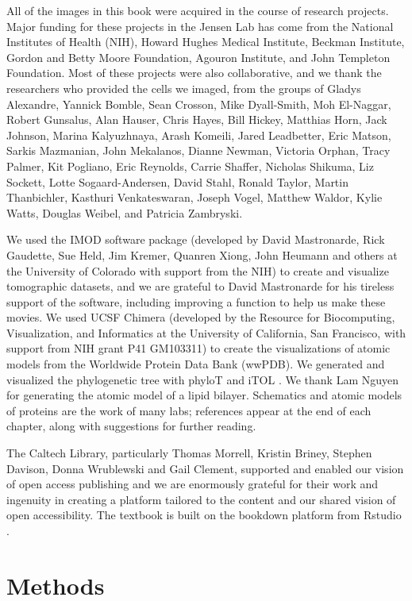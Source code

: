 \documentclass[]{tufte-book}
\begin{document}
All of the images in this book were acquired in the course of research
projects. Major funding for these projects in the Jensen Lab has come
from the National Institutes of Health (NIH), Howard Hughes Medical
Institute, Beckman Institute, Gordon and Betty Moore Foundation, Agouron
Institute, and John Templeton Foundation. Most of these projects were
also collaborative, and we thank the researchers who provided the cells
we imaged, from the groups of Gladys Alexandre, Yannick Bomble, Sean
Crosson, Mike Dyall-Smith, Moh El-Naggar, Robert Gunsalus, Alan Hauser,
Chris Hayes, Bill Hickey, Matthias Horn, Jack Johnson, Marina
Kalyuzhnaya, Arash Komeili, Jared Leadbetter, Eric Matson, Sarkis
Mazmanian, John Mekalanos, Dianne Newman, Victoria Orphan, Tracy Palmer,
Kit Pogliano, Eric Reynolds, Carrie Shaffer, Nicholas Shikuma, Liz
Sockett, Lotte Sogaard-Andersen, David Stahl, Ronald Taylor, Martin
Thanbichler, Kasthuri Venkateswaran, Joseph Vogel, Matthew Waldor, Kylie
Watts, Douglas Weibel, and Patricia Zambryski.

We used the IMOD software package (developed by David Mastronarde, Rick
Gaudette, Sue Held, Jim Kremer, Quanren Xiong, John Heumann and others
at the University of Colorado with support from the NIH) to create and
visualize tomographic datasets, and we are grateful to David Mastronarde
for his tireless support of the software, including improving a function
to help us make these movies. We used UCSF Chimera (developed by the
Resource for Biocomputing, Visualization, and Informatics at the
University of California, San Francisco, with support from NIH grant P41
GM103311) to create the visualizations of atomic models from the
Worldwide Protein Data Bank (wwPDB). We generated and visualized the
phylogenetic tree with phyloT and iTOL \citep{letunic2019}. We thank Lam
Nguyen for generating the atomic model of a lipid bilayer. Schematics
and atomic models of proteins are the work of many labs; references
appear at the end of each chapter, along with suggestions for further
reading.

The Caltech Library, particularly Thomas Morrell, Kristin Briney,
Stephen Davison, Donna Wrublewski and Gail Clement, supported and
enabled our vision of open access publishing and we are enormously
grateful for their work and ingenuity in creating a platform tailored to
the content and our shared vision of open accessibility. The textbook is
built on the bookdown platform from Rstudio \citep{xie2016}.

\chapter{Methods}\label{methods}
\end{document}
